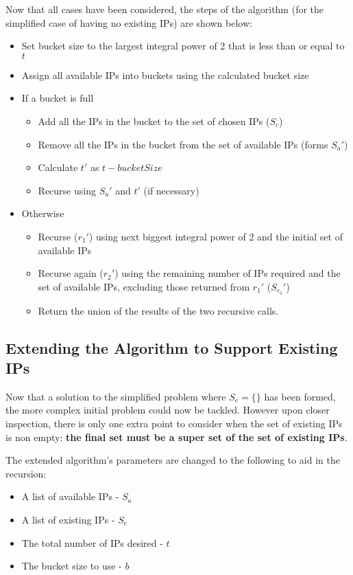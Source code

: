 Now that all cases have been considered, the steps of the algorithm (for the simplified case of having no existing IPs) are shown below:
\begin{itemize}
\item{Set bucket size to the largest integral power of 2 that is less than or equal to $t$}
\item{Assign all available IPs into buckets using the calculated bucket size}
\item{If a bucket is full}
  \begin{itemize}
  \item{Add all the IPs in the bucket to the set of chosen IPs ($S_c$)}
  \item{Remove all the IPs in the bucket from the set of available IPs (forms $S_a'$)}
  \item{Calculate $t'$ as $t - bucketSize$}
  \item{Recurse using $S_a'$ and $t'$ (if necessary)}
  \end{itemize}
\item{Otherwise}
  \begin{itemize}
  \item{Recurse ($r_1'$) using next biggest integral power of 2 and the initial set of available IPs}
  \item{Recurse again ($r_2'$) using the remaining number of IPs required and the set of available IPs, excluding those returned from $r_1'$ ($S_{c_1}'$)}
  \item{Return the union of the results of the two recursive calls.}
  \end{itemize}
\end{itemize}

\subsection{Extending the Algorithm to Support Existing IPs}
Now that a solution to the simplified problem where $S_e = \{\}$ has been formed, the more complex initial problem could now be tackled. However upon closer inspection, there is only one extra point to consider when the set of existing IPs is non empty: \textbf{the final set must be a super set of the set of existing IPs}. 

The extended algorithm's parameters are changed to the following to aid in the recursion:

\begin{itemize}
\item{A list of available IPs - $S_a$}
\item{A list of existing IPs - $S_e$}
\item{The total number of IPs desired - $t$}
\item{The bucket size to use - $b$}
\end{itemize}


